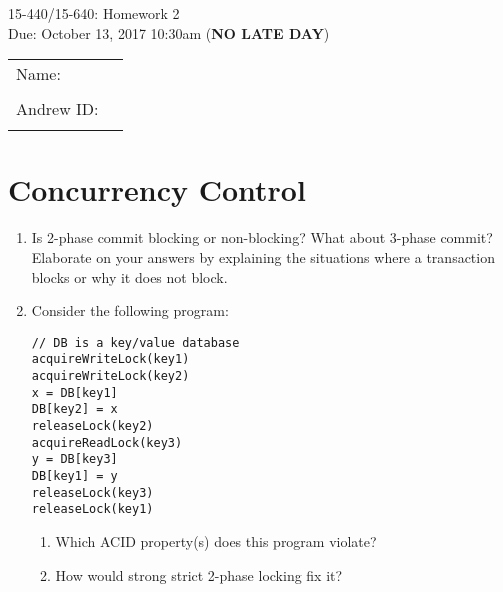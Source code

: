 \documentclass{article}
\def\answer#1{
    \vspace*{0.5em}\\
    \noindent\fbox{%
    \parbox{\textwidth}{%
		#1
    }%
}
}
\newcommand{\mycoursenum}{15-440/15-640}
\newcommand{\myhwnum}{2}
\newcommand{\myname}{}   %
\newcommand{\myandrew}{}  %
\begin{document}
\medskip
\thispagestyle{plain}
\begin{center}
{\Large \mycoursenum: Homework \myhwnum}\\
Due: October 13, 2017 10:30am (\large\textbf{NO LATE DAY}) \\
\medskip
\begin{tabular}{| l p{3in}|}
\hline
Name: \myname& \\
& \\ \hline
Andrew ID: \myandrew & \\
&\\
\hline
\end{tabular}
\end{center}




\section{Concurrency Control}
\begin{enumerate}
\item Is 2-phase commit blocking or non-blocking? What about 3-phase commit? Elaborate on your answers by explaining the situations where a transaction blocks or why it does not block.
    
\item Consider the following program:
\begin{verbatim}
// DB is a key/value database
acquireWriteLock(key1)
acquireWriteLock(key2)
x = DB[key1]
DB[key2] = x
releaseLock(key2)
acquireReadLock(key3)
y = DB[key3]
DB[key1] = y
releaseLock(key3)
releaseLock(key1)
\end{verbatim}
\begin{enumerate}
\item Which ACID property(s) does this program violate?
\item How would strong strict 2-phase locking fix it?
\end{enumerate}
\end{enumerate}

\end{document}
